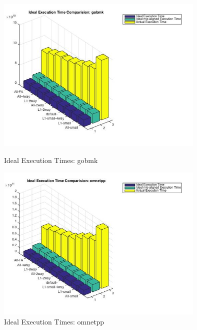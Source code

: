 \documentclass[11pt,titlepage]{article}
\begin{document}
    \begin{figure}[H]
        \centering
        \begin{minipage}{.5\textwidth}
            \centering
            \includegraphics[width=10cm]{idealGobmk}
            \caption{Ideal Execution Times: gobmk}
            \label{fig:idealG}
        \end{minipage}%
        \begin{minipage}{.5\textwidth}
            \centering
            \includegraphics[width=10cm]{idealOmnetpp}
            \caption{Ideal Execution Times: omnetpp}
            \label{fig:idealO}
        \end{minipage}
    \end{figure}
\end{document}
